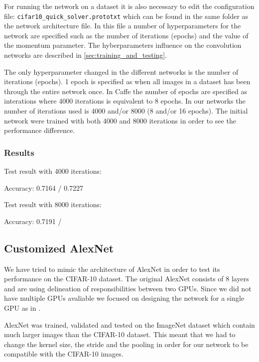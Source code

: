 For running the network on a dataset it is also necessary to edit the
configuration file: \verb|cifar10_quick_solver.prototxt| which can be found in
the same folder as the network architecture file. In this file a number of
hyperparameters for the network are specified such as the number of iterations
(epochs) and the value of the momentum parameter. The hyberparameters influence
on the convolution networks are described in \autoref{sec:training_and_testing}.


The only hyperparameter changed in the different networks is the number of
iterations (epochs). 1 epoch is specified as when all images in a dataset has
been through the entire network once. In Caffe the number of epochs are
specified as interations where 4000 iterations is equivalent to 8 epochs. In
our networks the number of iterations used is 4000 and/or 8000 (8 and/or 16
epochs). The initial network were trained with both 4000 and 8000 iterations in
order to see the performance difference.  


\subsubsection{Results}


Test result with 4000 iterations:

Accuracy: 0.7164 / 0.7227

Test result with 8000 iterations:

Accuracy: 0.7191 /



\subsection{Customized AlexNet} %
\label{sub:alexNet}

We have tried to mimic the architecture of AlexNet\cite{AlexNet} in order to
test its performance on the CIFAR-10 dataset. The original AlexNet consists of 8
layers and are using delineation of responsibilities between two GPUs. Since we
did not have multiple GPUs avaliable we focused on designing the network for a
single GPU as in \cite{ZeilerFergus}. 

AlexNet was trained, validated and tested on the ImageNet dataset which contain
much larger images than the CIFAR-10 dataset. This meant that we had to change
the kernel size, the stride and the pooling in order for our network to be
compatible with the CIFAR-10 images. 


